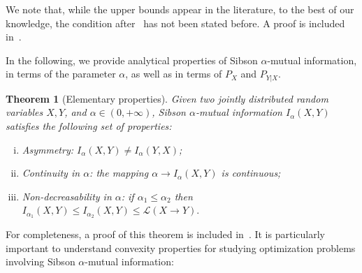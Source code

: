 \documentclass{article}
\newtheorem{theorem}{Theorem}
\numberwithin{theorem}{section}
\numberwithin{example}{section}
\numberwithin{remark}{section}
\numberwithin{definition}{section}
\newcommand{\ml}[2]{\mathcal{L}\left(#1  \!\!  \to  \!\!   #2\right)} %
\begin{document}
We note that, while the upper bounds appear in the literature, to the best of our knowledge, the condition after~ has not been stated before. A proof is included in~.

In the following, we provide analytical properties of Sibson $\alpha$-mutual information, in terms of the parameter $\alpha$, as well as in terms of $P_X$ and $P_{Y|X}$.

\begin{theorem}[Elementary properties]\label{thm:properties-alpha}
    Given two jointly distributed random variables $X,Y$, and $\alpha\in (0,+\infty)$, Sibson $\alpha$-mutual information $I_\alpha(X,Y)$ satisfies the following set of properties:
    \begin{enumerate}[i)]
    \item Asymmetry: $I_\alpha(X,Y)\neq I_\alpha(Y,X)$\label{prop:asymm};
        \item Continuity in $\alpha$: the mapping $\alpha\to I_\alpha(X,Y)$ is continuous\label{prop:continuity};
        \item Non-decreasability in $\alpha$: if $\alpha_1\leq \alpha_2$ then $I_{\alpha_1}(X,Y)\leq I_{\alpha_2}(X,Y)\leq \ml{X}{Y}.$\label{prop:nonDecr}
    \end{enumerate}
\end{theorem}

For completeness, a proof of this theorem is included in~. It is particularly important to understand convexity properties for studying optimization problems involving Sibson $\alpha$-mutual information:
\end{document}

